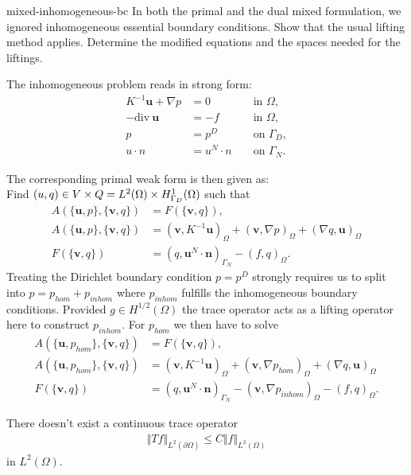 \begin{Problem}{mixed-inhomogeneous-bc}
  In both the primal and the dual mixed formulation, we ignored
  inhomogeneous essential boundary conditions. Show that the usual
  lifting method applies. Determine the modified equations and the
  spaces needed for the liftings.
\begin{solution}
The inhomogeneous problem reads in strong form:\\
\begin{align*}
K^{-1} {\mathbf u} + \nabla p &= 0 && \textrm{ in } \Omega,\\
-{\textrm{div}}\ {\mathbf u} &= -f && \textrm{ in } \Omega,\\
p &= p^D && \textrm{ on } \Gamma_D, \\
u\cdot n &=  u^N \cdot n && \textrm{ on } \Gamma_N.
\end{align*}

The corresponding primal weak form is then given as: \\
Find $(u,q)\in V\times Q=L^2(\Omega)\times H_{\Gamma_D}^1(\Omega)$ such that
\begin{align*}
A(\{{\mathbf u},p\},\{{\mathbf v},q\}) &= F(\{{\mathbf v},q\}), \\
A(\{{\mathbf u},p\},\{{\mathbf v},q\}) &= ({\mathbf v}, K^{-1}{\mathbf u})_\Omega +({\mathbf v}, \nabla p)_\Omega + (\nabla q,{\mathbf u})_\Omega \\
F(\{{\mathbf v},q\}) &= (q, {\mathbf u}^N\cdot {\mathbf n})_{\Gamma_N} - (f,q)_\Omega.
\end{align*}
Treating the Dirichlet boundary condition $p = p^D$ strongly requires us to
split into $p=p_{hom} + p_{inhom}$ where $p_{inhom}$ fulfills the inhomogeneous
boundary conditions. Provided $g\in H^{1/2}(\Omega)$ the trace operator acts
as a lifting operator here to construct $p_{inhom}$.
For $p_{hom}$ we then have to solve
\begin{align*}
A(\{{\mathbf u},p_{hom}\},\{{\mathbf v},q\}) &= F(\{{\mathbf v},q\}), \\
A(\{{\mathbf u},p_{hom}\},\{{\mathbf v},q\})
  &= ({\mathbf v}, K^{-1}{\mathbf u})_\Omega +({\mathbf v}, \nabla p_{hom})_\Omega
     + (\nabla q,{\mathbf u})_\Omega \\
F(\{{\mathbf v},q\})
  &= (q, {\mathbf u}^N\cdot {\mathbf n})_{\Gamma_N}-
     ({\mathbf v}, \nabla p_{inhom})_\Omega - (f,q)_\Omega.
\end{align*}

There doesn't exist a continuous trace operator
\begin{align*}
 \Vert T f \Vert_{L^2(\partial \Omega)}\le C \Vert f \Vert_{L^2(\Omega)}
\end{align*}
in $L^2(\Omega)$.



\end{solution}
\end{Problem}
